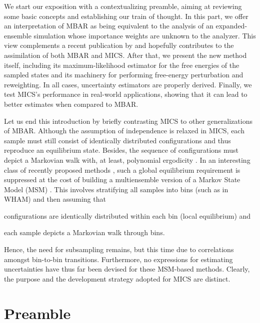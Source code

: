 \documentclass[journal=jctcce,manuscript=article]{achemso}
\begin{document}
We start our exposition with a contextualizing preamble, aiming at reviewing some basic concepts and establishing our train of thought. In this part, we offer an interpretation of MBAR as being equivalent to the analysis of an expanded-ensemble simulation \cite{Lyubartsev_1992} whose importance weights are unknown to the analyzer. This view complements a recent publication by \citeauthor{Shirts_2017} \cite{Shirts_2017} and hopefully contributes to the assimilation of both MBAR and MICS. After that, we present the new method itself, including its maximum-likelihood estimator for the free energies of the sampled states and its machinery for performing free-energy perturbation and reweighting. In all cases,  uncertainty estimators are properly derived. Finally, we test MICS's performance in real-world applications, showing that it can lead to better estimates when compared to MBAR.

Let us end this introduction by briefly contrasting MICS to other generalizations of MBAR. Although the assumption of independence is relaxed in MICS, each sample must still consist of identically distributed configurations and thus reproduce an equilibrium state. Besides, the sequence of configurations must depict a Markovian walk with, at least, polynomial ergodicity \cite{Roy_2018}. In an interesting class of recently proposed methods \cite{Mey_2014, Wu_2014, Rosta_2015, Wu_2016}, such a global equilibrium requirement is suppressed at the cost of building a multiensemble version \cite{Wu_2016} of a Markov State Model (MSM) \cite{Pande_2010, Husic_2018}. This involves stratifying all samples into bins (such as in WHAM) and then assuming that \begin{enumerate*}[label = \arabic*)] \item configurations are identically distributed within each bin (local equilibrium) and \item each sample depicts a Markovian walk through bins.\end{enumerate*} Hence, the need for subsampling remains, but this time due to correlations amongst bin-to-bin transitions. Furthermore, no expressions for estimating uncertainties have thus far been devised for these MSM-based methods. Clearly, the purpose and the development strategy adopted for MICS are distinct.

\section{Preamble}
\end{document}
